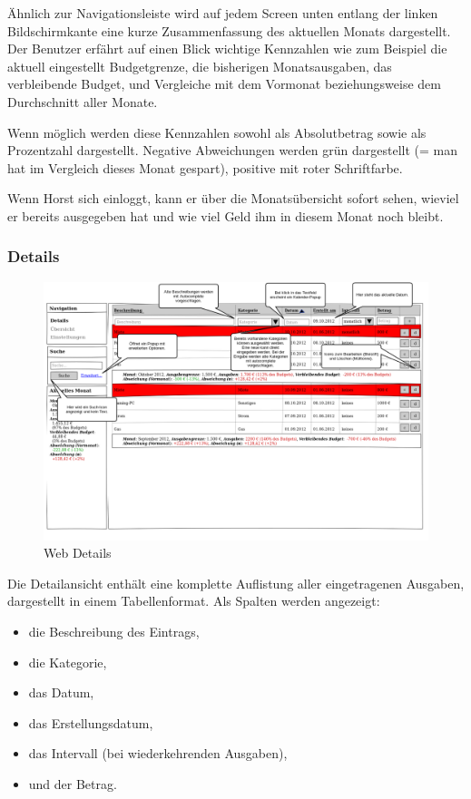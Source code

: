 \"Ahnlich zur Navigationsleiste wird auf jedem Screen unten entlang der linken
Bildschirmkante eine kurze Zusammenfassung des aktuellen Monats dargestellt.
Der Benutzer erfährt auf einen Blick wichtige Kennzahlen wie zum Beispiel die
aktuell eingestellt Budgetgrenze, die bisherigen Monatsausgaben, das
verbleibende Budget, und Vergleiche mit dem Vormonat beziehungsweise dem
Durchschnitt aller Monate.

Wenn möglich werden diese Kennzahlen sowohl als Absolutbetrag sowie als
Prozentzahl dargestellt. Negative Abweichungen werden grün dargestellt (= man
hat im Vergleich dieses Monat gespart), positive mit roter Schriftfarbe.

Wenn Horst sich einloggt, kann er über die Monats\"ubersicht sofort sehen,
wieviel er bereits ausgegeben hat und wie viel Geld ihm in diesem Monat noch
bleibt.

\subsubsection{Details}

\begin{figure}[htl]
\centering
\includegraphics[width=\textwidth]{img/web_details}
\caption{Web Details}
\label{fig:web_details}
\end{figure}

Die Detailansicht enthält eine komplette Auflistung aller eingetragenen Ausgaben, dargestellt
in einem Tabellenformat. Als Spalten werden angezeigt:

\begin{itemize}
    \item die Beschreibung des Eintrags,
    \item die Kategorie,
    \item das Datum,
    \item das Erstellungsdatum,
    \item das Intervall (bei wiederkehrenden Ausgaben),
    \item und der Betrag.
\end{itemize}

